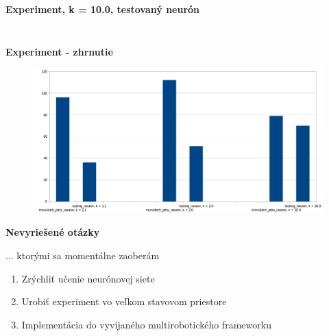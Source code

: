 \documentclass[xcolor=dvipsnames]{beamer}
\begin{document}
\begin{frame}{\bf Experiment, k = 10.0, testovaný neurón}
\begin{columns}
\begin{column}{0.5\textwidth}
\begin{figure}[ht]
        \end{figure}

	\end{column}
\end{columns}

\end{frame}

\begin{frame}[fragile]{\bf Experiment - zhrnutie}

\begin{figure}[ht]
\begin{center}
\begin{minipage}{0.8\linewidth}
\begin{center}
  \includegraphics[width=1.0\textwidth]{comparsion.png}
\end{center}
\end{minipage}
\end{center}
\end{figure}

\end{frame}



\begin{frame}[fragile]{\bf Nevyriešené otázky}

    ... ktorými sa momentálne zaoberám

	\begin{enumerate}
	\item{Zrýchliť učenie neurónovej siete}
	\item{Urobiť experiment vo veľkom stavovom priestore}
    \item{Implementácia do vyvíjaného multirobotického frameworku}
	\end{enumerate}

\end{frame}
\end{document}
